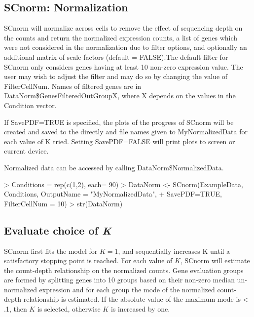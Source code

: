 \documentclass{article}
\begin{document}
  \subsection{SCnorm: Normalization}
\label{sec:Normalization}
SCnorm will normalize across cells to remove the effect of sequencing depth on the counts and return the normalized expression counts, a list of genes which were not considered in the normalization due to filter options, and optionally an additional matrix of scale factors (default = FALSE).The default filter for SCnorm only considers genes having at least 10 non-zero expression value. The user may wish to adjust the filter and may do so by changing the value of FilterCellNum. Names of filtered genes are in DataNorm\$GenesFilteredOutGroupX, where X depends on the values in the Condition vector.

If SavePDF=TRUE is specified, the plots of the progress of SCnorm will be created and saved to the directly and file names given to MyNormalizedData for each value of K tried. Setting SavePDF=FALSE will print plots to screen or current device.

Normalized data can be accessed by calling DataNorm\$NormalizedData.

\begin{Schunk}
\begin{Sinput}
> Conditions = rep(c(1,2), each= 90)
> DataNorm <- SCnorm(ExampleData, Conditions, OutputName = "MyNormalizedData",
+                      SavePDF=TRUE, FilterCellNum = 10)
> str(DataNorm)
\end{Sinput}
\end{Schunk}

\subsection{Evaluate choice of \textit{K}}
\label{sec:NormalizationK}

SCnorm first fits the model for $K = 1$, and sequentially increases K until a satisfactory stopping point is reached. For each value of $K$, SCnorm will estimate the count-depth relationship on the normalized counts. Gene evaluation groups are formed by splitting genes into 10 groups based on their non-zero median un-normalized expression and for each group the mode of the normalized count-depth relationship is estimated. If the absolute value of the maximum mode is < .1, then $K$ is selected, otherwise $K$ is increased by one.
\end{document}
